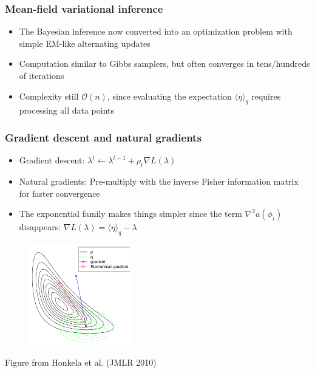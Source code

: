 \documentclass{beamer}
\newcommand{\vparameters}{\phi}
\begin{document}
\begin{frame}
  \frametitle{Mean-field variational inference}

  \begin{itemize}
    \item The Bayesian inference now converted into an optimization
      problem with simple EM-like alternating updates
    \item Computation similar to Gibbs samplers, but often converges
      in tens/hundreds of iterations
    \item Complexity still $\mathcal{O}(n)$, since evaluating the
      expectation $\langle \eta \rangle_q$ requires processing all data points
  \end{itemize}
\end{frame}

\begin{frame}
  \frametitle{Gradient descent and natural gradients}

  \begin{itemize}
    \item Gradient descent: $\lambda^t \leftarrow \lambda^{t-1}
      + \rho_t \nabla L(\lambda)$
    \item Natural gradients: Pre-multiply with the inverse Fisher
      information matrix for faster convergence
    \item The exponential family makes things simpler since
      the term $\nabla^2 a(\vparameters_i)$ disappears:
      $\nabla L(\lambda) = \langle \eta \rangle_q - \lambda$
  \end{itemize}
  \begin{figure}
  \begin{center}
  \includegraphics[width=0.4\textwidth]{VBnatgrad.pdf}
  \end{center}
  \end{figure}
  \vfill \hfill {\tiny Figure from Honkela et al. (JMLR 2010)}
\end{frame}
\end{document}
